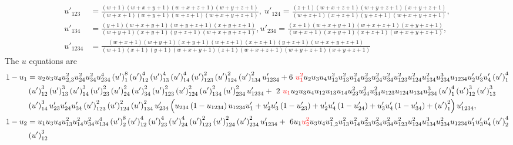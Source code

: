 \documentclass[hidelinks,12pt]{article}
\begin{document}
{\begin{align*}
u'_{123} &=  \frac{(w+1) (w+x+y+1) (w+x+z+1) (w+y+z+1)}{(w+x+1) (w+y+1) (w+z+1) (w+x+y+z+1)},~u'_{124}= \frac{(z+1) (w+x+z+1) (w+y+z+1) (x+y+z+1)}{(w+z+1) (x+z+1) (y+z+1) (w+x+y+z+1)},\nonumber \\  u'_{134}&= \frac{(y+1) (w+x+y+1) (w+y+z+1) (x+y+z+1)}{(w+y+1)(x+y+1) (y+z+1) (w+x+y+z+1)},u'_{234} = \frac{(x+1) (w+x+y+1) (w+x+z+1) (x+y+z+1)}{(w+x+1) (x+y+1) (x+z+1) (w+x+y+z+1)},\nonumber \\  u'_{1234} &= \frac{(w+x+1) (w+y+1)(x+y+1) (w+z+1) (x+z+1) (y+z+1) (w+x+y+z+1)}{(w+1) (x+1) (y+1) (w+x+y+1) (z+1) (w+x+z+1) (w+y+z+1) (x+y+z+1)} \nonumber
\end{align*}
}
\newpage
\vspace*{-25pt}
The $u$ equations are 
{\tiny
{\begin{align*}
1-u_1&=u_2 u_3 u_4 u_{2,3}^2 u_{24}^2 u_{34}^2 u_{234}^4
   \left(u'\right)_1^8 \left(u'\right)_{12}^4 \left(u'\right)_{13}^4
   \left(u'\right)_{14}^4 \left(u'\right)_{123}^2
   \left(u'\right)_{124}^2 \left(u'\right)_{134}^2 u'_{1234}+ 6~
 \textcolor{red}{  u_1^2} u_2 u_3 u_4 u_{12}^2 u_{13}^2 u_{14}^2 u_{23}^2 u_{24}^2
   u_{34}^2 u_{123}^2 u_{124}^2 u_{134}^2 u_{234}^3 u_{1234}
   u'_2 u'_3 u'_4 \left(u'\right)_1^4  \nonumber \\ &\left(u'\right)_{12}^3
   \left(u'\right)_{13}^3 \left(u'\right)_{14}^3
   \left(u'\right)_{23}^2 \left(u'\right)_{24}^2
   \left(u'\right)_{34}^2 \left(u'\right)_{123}^2
   \left(u'\right)_{124}^2 \left(u'\right)_{134}^2
   \left(u'\right)_{234}^2 u'_{1234}+~2 ~\textcolor{red}{u_1} u_2 u_3 u_4 u_{12}
   u_{13} u_{14} u_{23}^2 u_{24}^2 u_{34}^2 u_{123} u_{124}
   u_{134} u_{234}^3 \left(u'\right)_1^4 \left(u'\right)_{12}^3
   \left(u'\right)_{13}^3 \nonumber \\ & \left(u'\right)_{14}^3 u'_{23} u'_{24}
   u'_{34} \left(u'\right)_{123}^2 \left(u'\right)_{124}^2
   \left(u'\right)_{134}^2 u'_{234} \left(u_{234}
   \left(1-u_{1234}\right) u_{1234} u'_1+u'_2 u'_3
   \left(1-u'_{23}\right)+u'_2 u'_4 \left(1-u'_{24}\right)+u'_3 u'_4
   \left(1-u'_{34}\right)+\left(u'\right)_1^2\right) u'_{1234} ,\nonumber \\
   1-u_2&=u_1 u_3 u_4 u_{13}^2 u_{14}^2 u_{34}^2 u_{134}^4
   \left(u'\right)_2^8 \left(u'\right)_{12}^4 \left(u'\right)_{23}^4
   \left(u'\right)_{24}^4 \left(u'\right)_{123}^2
   \left(u'\right)_{124}^2 \left(u'\right)_{234}^2 u'_{1234}+~6
   u_1 \textcolor{red}{u_2^2} u_3 u_4 u_{1,2}^2 u_{13}^2 u_{14}^2 u_{23}^2 u_{24}^2
   u_{34}^2 u_{123}^2 u_{124}^2 u_{134}^3 u_{234}^2 u_{1234}
   u'_1 u'_3 u'_4 \left(u'\right)_2^4 \nonumber \\ &\left(u'\right)_{12}^3

\end{align*}}}
\end{document}

